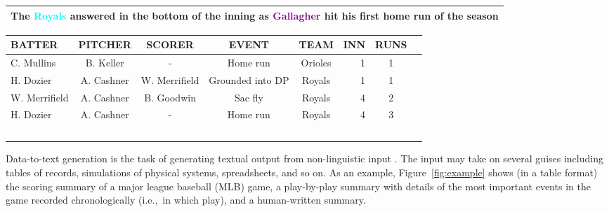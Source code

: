 \documentclass[11pt,a4paper]{article}
\newcommand{\lform}[1]{\textsf{\scriptsize{#1}}}
\begin{document}
\begin{figure*}
\begin{small}
\begin{minipage}{0.5\textwidth}
\begin{tabular}{p{9cm}}
{                  The \textcolor{cyan}{\textbf{Royals}} answered in the bottom of the inning as \textcolor{purple}{\textbf{Gallagher}} hit his
                  first home run of the season\lform{}
}
\\
\hline \end{tabular}
\end{minipage}
\begin{minipage}{\textwidth}
\vspace{.2cm}
\hspace*{4cm}\begin{tabular}{@{}l@{~~}c@{~~}c@{~~}c@{~~}cr@{~~}c@{~~}l@{}} \hline
\lform{BATTER}&\lform{PITCHER}&\lform{SCORER}&\lform{EVENT}&\lform{TEAM} & \lform{INN} & \lform{RUNS} & \lform{}\\ \hline
\lform{C. Mullins}&\lform{B. Keller}&\lform{-}&\lform{Home run}&\lform{Orioles} & \lform{1} &  \lform{1} & \lform{}\\ 
\lform{H. Dozier}&\lform{A. Cashner}&\lform{W. Merrifield}&\lform{Grounded into DP}&\lform{Royals} & \lform{1} & \lform{1} & \lform{}\\ 
\lform{W. Merrifield}&\lform{A. Cashner}&\lform{B. Goodwin}&\lform{Sac fly}&\lform{Royals} & \lform{4} & \lform{2} & \lform{}\\ 
\lform{H. Dozier}&\lform{A. Cashner}&\lform{-}&\lform{Home run}&\lform{Royals} & \lform{4} & \lform{3} & \lform{}\\ 
\lform{} & \lform{} & \lform{} & \lform{} &  \lform{} & \lform{} & \lform{}\ & \lform{}\\\hline
\end{tabular}

\end{minipage}
\end{small}
\caption{MLB statistics tables and game summary. The tables summarize
  the performance of the two teams and of individual team members who
  played as batters and pitchers as well as the most important events
  (and their actors) in each play. Recurring entities in the summary
  are boldfaced and colorcoded, singletons are shown in black. }
\label{fig:example}
\end{figure*}


Data-to-text generation is the task of generating textual output from
non-linguistic input \cite{Reiter:1997:BAN:974487.974490,
  DBLP:journals/jair/GattK18}. The input may take on several guises including
tables of records, simulations of physical systems, spreadsheets, and
so on. As an example, Figure~\ref{fig:example} shows (in a table
format) the scoring summary of a major league baseball (MLB) game, a
play-by-play summary with details of the most important events in the
game recorded chronologically (i.e.,~in which play), and a
 human-written summary.
\end{document}
